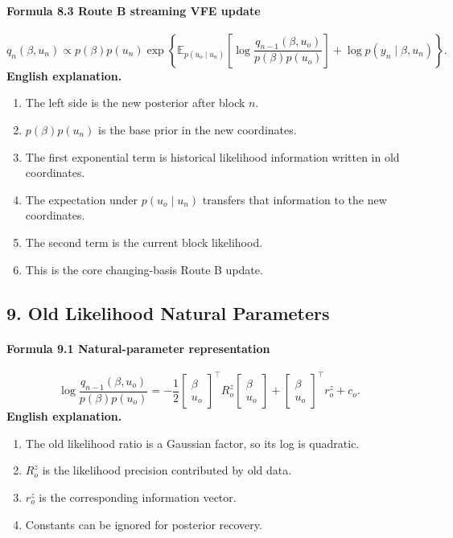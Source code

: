 \documentclass[12pt]{article}
\begin{document}
\paragraph{Formula 8.3 Route B streaming VFE update}
\[
q_n(\beta,u_n)\propto
p(\beta)p(u_n)
\exp\left\{
\mathbb E_{p(u_o\mid u_n)}
\left[
\log\frac{q_{n-1}(\beta,u_o)}{p(\beta)p(u_o)}
\right]
+\log p(y_n\mid\beta,u_n)
\right\}.
\]
\textbf{English explanation.}
\begin{enumerate}[leftmargin=2em]
\item The left side is the new posterior after block \(n\).
\item \(p(\beta)p(u_n)\) is the base prior in the new coordinates.
\item The first exponential term is historical likelihood information written in old coordinates.
\item The expectation under \(p(u_o\mid u_n)\) transfers that information to the new coordinates.
\item The second term is the current block likelihood.
\item This is the core changing-basis Route B update.
\end{enumerate}

\subsection{9. Old Likelihood Natural Parameters}
\paragraph{Formula 9.1 Natural-parameter representation}
\[
\log\frac{q_{n-1}(\beta,u_o)}{p(\beta)p(u_o)}
=
-\frac12
\begin{bmatrix}\beta\\u_o\end{bmatrix}^\top
R_o^z
\begin{bmatrix}\beta\\u_o\end{bmatrix}
+
\begin{bmatrix}\beta\\u_o\end{bmatrix}^\top r_o^z
+c_o.
\]
\textbf{English explanation.}
\begin{enumerate}[leftmargin=2em]
\item The old likelihood ratio is a Gaussian factor, so its log is quadratic.
\item \(R_o^z\) is the likelihood precision contributed by old data.
\item \(r_o^z\) is the corresponding information vector.
\item Constants can be ignored for posterior recovery.
\end{enumerate}
\end{document}
